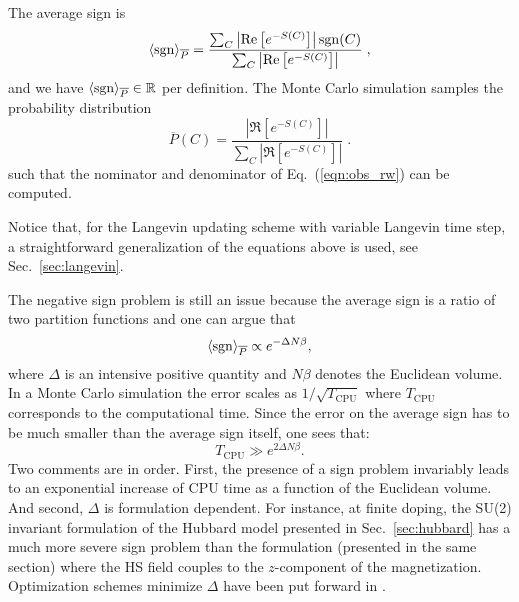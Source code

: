 The average sign is 
\begin{equation}\label{eqn:sign_rw}
	 \langle \operatorname{sgn} \rangle_{\overline{P}} =    \frac { \sum_{C}  \left|  \operatorname{Re} \left[ e^{-S(C)} \right]   \right|   \operatorname{sgn}(C) }  {  \sum_{C}   \left| \operatorname{Re} \left[ e^{-S(C)} \right] \right|  } \;,
\end{equation}
and we have  $\langle \operatorname{sgn} \rangle_{\overline{P}} \in \mathbb{R}$ per definition.
The Monte Carlo simulation samples the probability distribution 
\begin{equation}  
	 \overline{P}(C) = \frac{ \left|  \Re \left[ e^{-S(C)} \right] \right| }{\sum_C \left|  \Re \left[ e^{-S(C)} \right]  \right| }\;.
\label{Eq:Pbar}
\end{equation}
such that the nominator and denominator of  Eq.~(\ref{eqn:obs_rw})  can be computed.

Notice that, for the Langevin updating scheme with variable Langevin time step, a straightforward generalization of the equations above is used, see Sec.~\ref{sec:langevin}.

The negative sign problem is still an issue because the average sign is a ratio of two partition functions and one can argue that 
\begin{equation}
 \langle \operatorname{sgn} \rangle_{\overline{P}}   \propto e^{-  \Delta N \beta},
\end{equation}
where $\Delta $ is an intensive positive quantity and $N \beta$ denotes the  Euclidean volume.    In a Monte Carlo simulation the  error scales as $ 1/\sqrt{T_\text{CPU}} $   where $T_\text{CPU}$ corresponds to the computational  time.  Since the error on the  average sign has to be much smaller than the average sign itself,   one sees that:
\begin{equation}
	T_\text{CPU}  \gg e^{2 \Delta N \beta}.
\end{equation}   
Two comments are in order. First, the presence of a sign problem invariably leads to an exponential increase of CPU time as a function of the Euclidean volume. And second,  $\Delta$ is formulation dependent.  
For instance, at finite doping, the SU(2) invariant formulation of the Hubbard model presented in Sec.~\ref{sec:hubbard} has a much more severe sign problem than the formulation (presented in the same section) where the HS field couples to the $z$-component of the magnetization.   Optimization schemes minimize  $\Delta$  have been put forward in \cite{Wan20,Hangleiter20}.




 
